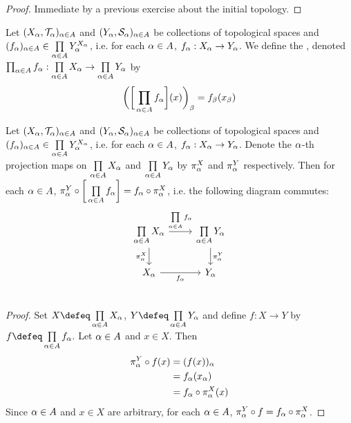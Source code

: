 \documentclass{book}
\begin{document}
	\begin{proof}
		Immediate by a previous exercise about the initial topology.
	\end{proof}

	\begin{defn}
		Let $(X_{\alpha}, \mathcal{T}_{\alpha})_{\alpha \in A}$ and $(Y_{\alpha}, \mathcal{S}_{\alpha})_{\alpha \in A}$ be collections of topological spaces and $(f_{\alpha})_{\alpha \in A} \in \prod\limits_{\alpha \in A} Y_{\alpha}^{X_{\alpha}}$, i.e. for each $\alpha \in A$, $f_{\alpha}:X_{\alpha} \rightarrow Y_{\alpha}$. We define the , denoted $\prod_{\alpha \in A} f_{\alpha}: \prod\limits_{\alpha \in A} X_{\alpha} \rightarrow  \prod\limits_{\alpha \in A} Y_{\alpha}$ by 
		$$\bigg( \bigg[\prod_{\alpha \in A} f_{\alpha} \bigg] (x) \bigg)_{\beta} = f_{\beta}(x_{\beta})$$
	\end{defn}
	
	\begin{ex}
		Let $(X_{\alpha}, \mathcal{T}_{\alpha})_{\alpha \in A}$ and $(Y_{\alpha}, \mathcal{S}_{\alpha})_{\alpha \in A}$ be collections of topological spaces and $(f_{\alpha})_{\alpha \in A} \in \prod\limits_{\alpha \in A} Y_{\alpha}^{X_{\alpha}}$, i.e. for each $\alpha \in A$, $f_{\alpha}:X_{\alpha} \rightarrow Y_{\alpha}$. Denote the $\alpha$-th projection maps on $\prod\limits_{\alpha \in A} X_{\alpha}$ and $\prod\limits_{\alpha \in A} Y_{\alpha}$ by $\pi^X_{\alpha}$ and $\pi^Y_{\alpha}$ respectively. Then for each $\alpha \in A$, $\pi^Y_{\alpha} \circ \bigg[ \prod\limits_{\alpha \in A} f_{\alpha} \bigg]  = f_{\alpha} \circ \pi^X_{\alpha}$, i.e. the following diagram commutes:
		\[ 
		\begin{tikzcd}
			\prod\limits_{\al \in A} X_{\al}  \arrow[r, "\prod\limits_{\al \in A} f_{\al}"]  \arrow[d, "\pi^X_{\al}"'] & \prod\limits_{\al \in A} Y_{\al} \arrow[d, "\pi^Y_{\al}"]\\
			X_{\al} \arrow[r, "f_{\al}"'] &  Y_{\al} \\
		\end{tikzcd}
		\]
	\end{ex}

	\begin{proof}
		Set $X \defeq \prod\limits_{\al \in A} X_{\al}$, $Y \defeq \prod\limits_{\al \in A}Y_{\al}$ and define $f: X \rightarrow Y$ by $f \defeq \prod\limits_{\al \in A} f_{\al}$. Let $\alpha \in A$ and $x \in X$. Then
		\begin{align*}
			\pi^Y_{\alpha} \circ f(x) 
			& = (f(x))_{\alpha} \\
			& = f_{\alpha}(x_{\alpha}) \\
			& = f_{\alpha} \circ \pi^X_{\alpha}(x) 
		\end{align*}
		Since $\alpha \in A$ and $x \in X$ are arbitrary, for each $\alpha \in A$, $\pi^Y_{\alpha} \circ f = f_{\alpha} \circ \pi^X_{\alpha}$.
	\end{proof}
	
\end{document}
